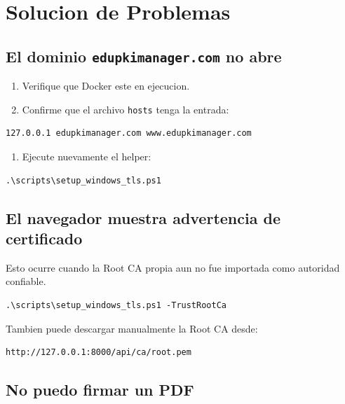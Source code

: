 \documentclass[12pt,a4paper]{article}
\begin{document}
\section{Solucion de Problemas}

\subsection{El dominio \texttt{edupkimanager.com} no abre}

\begin{enumerate}[leftmargin=*]
    \item Verifique que Docker este en ejecucion.
    \item Confirme que el archivo \texttt{hosts} tenga la entrada:
\end{enumerate}

\begin{lstlisting}[style=terminal]
127.0.0.1 edupkimanager.com www.edupkimanager.com
\end{lstlisting}

\begin{enumerate}[leftmargin=*,resume]
    \item Ejecute nuevamente el helper:
\end{enumerate}

\begin{lstlisting}[style=terminal]
.\scripts\setup_windows_tls.ps1
\end{lstlisting}

\subsection{El navegador muestra advertencia de certificado}

Esto ocurre cuando la Root CA propia aun no fue importada como autoridad confiable.

\begin{lstlisting}[style=terminal]
.\scripts\setup_windows_tls.ps1 -TrustRootCa
\end{lstlisting}

Tambien puede descargar manualmente la Root CA desde:

\begin{lstlisting}[style=terminal]
http://127.0.0.1:8000/api/ca/root.pem
\end{lstlisting}

\subsection{No puedo firmar un PDF}
\end{document}
